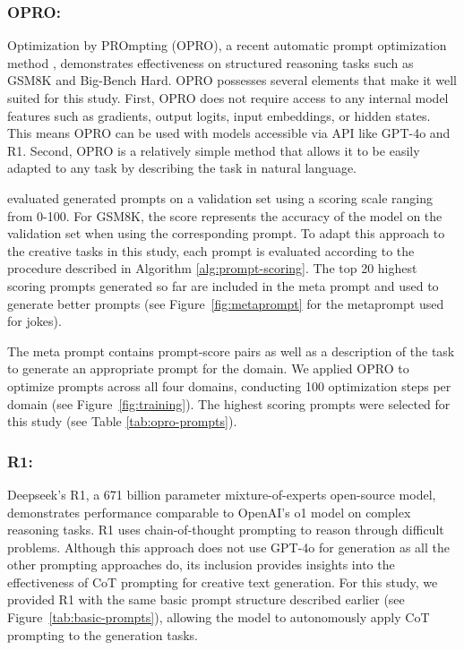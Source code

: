\documentclass[phd,electronic,oneside,twosidetoc,letterpaper,chaptercenter,parttop,lof]{byumsphd}
\begin{document}
\subsubsection{OPRO: }Optimization by PROmpting (OPRO), a recent automatic prompt optimization method \cite{yang2024opro}, demonstrates effectiveness on structured reasoning tasks such as GSM8K and Big-Bench Hard. OPRO possesses several elements that make it well suited for this study. First, OPRO does not require access to any internal model features such as gradients, output logits, input embeddings, or hidden states. This means OPRO can be used with models accessible via API like GPT-4o and R1. Second, OPRO is a relatively simple method that allows it to be easily adapted to any task by describing the task in natural language. 

\citeauthor{yang2024opro} evaluated generated prompts on a validation set using a scoring scale ranging from 0-100. For GSM8K, the score represents the accuracy of the model on the validation set when using the corresponding prompt. To adapt this approach to the creative tasks in this study, each prompt is evaluated according to the procedure described in Algorithm \ref{alg:prompt-scoring}. The top 20 highest scoring prompts generated so far are included in the meta prompt and used to generate better prompts (see Figure~\ref{fig:metaprompt} for the metaprompt used for jokes).

The meta prompt contains prompt-score pairs as well as a description of the task to generate an appropriate prompt for the domain. We applied OPRO to optimize prompts across all four domains, conducting 100 optimization steps per domain (see Figure~\ref{fig:training}). The highest scoring prompts were selected for this study (see Table \ref{tab:opro-prompts}).

\subsubsection{R1: }

Deepseek's R1, a 671 billion parameter mixture-of-experts open-source model, demonstrates performance comparable to OpenAI's o1 model on complex reasoning tasks. R1 uses chain-of-thought prompting to reason through difficult problems. Although this approach does not use GPT-4o for generation as all the other prompting approaches do, its inclusion provides insights into the effectiveness of CoT prompting for creative text generation. For this study, we provided R1 with the same basic prompt structure described earlier (see Figure~\ref{tab:basic-prompts}), allowing the model to autonomously apply CoT prompting to the generation tasks.
\end{document}
